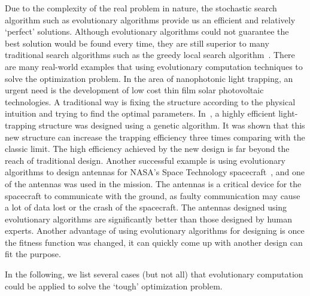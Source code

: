 Due to the complexity of the real problem in nature, the stochastic search algorithm such as evolutionary algorithms provide us an efficient and relatively `perfect' solutions. Although evolutionary algorithms could not guarantee the best solution would be found every time, they are still superior to many traditional search algorithms such as the greedy local search algorithm~\cite{Gutin200281}. There are many real-world examples that using evolutionary computation techniques to solve the optimization problem. In the area of nanophotonic light trapping, an urgent need is the development of low cost thin film solar photovoltaic technologies. A traditional way is fixing the structure according to the physical intuition and trying to find the optimal parameters. In~\cite{Wang2013}, a highly efficient light-trapping structure was designed using a genetic algorithm. It was shown that this new structure can increase the trapping efficiency three times comparing with the classic limit. The high efficiency achieved by the new design is far beyond the reach of traditional design. Another successful example is using evolutionary algorithms to design antennas for NASA's Space Technology spacecraft~\cite{Hornby2011}, and one of the antennas was used in the mission. The antennas is a critical device for the spacecraft to communicate with the ground, as faulty communication may cause a lot of data lost or the crash of the spacecraft. The antennas designed using evolutionary algorithms are significantly better than those designed by human experts. Another advantage of using evolutionary algorithms for designing is once the fitness function was changed, it can quickly come up with another design can fit the purpose. 

In the following, we list several cases (but not all) that evolutionary computation could be applied to solve the `tough' optimization problem. 

